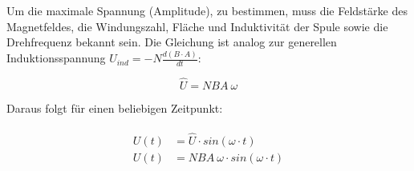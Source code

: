 Um die maximale Spannung (Amplitude), zu bestimmen, muss die Feldstärke des Magnetfeldes, die Windungszahl, Fläche und Induktivität der Spule sowie die Drehfrequenz bekannt sein. Die Gleichung ist analog zur generellen Induktionsspannung $U_{ind} = -N \frac{d(B \cdot A)}{dt}$:

\begin{equation}	\label{eq:hatU}
	\hat{U} = NBA \ \omega
\end{equation}

Daraus folgt für einen beliebigen Zeitpunkt:

\begin{align}		\label{eq:hatUbeliebig}
\begin{split}
	U(t) &= \hat{U} \cdot sin(\omega \cdot t) \\
	U(t) &= NBA \ \omega \cdot sin(\omega \cdot t)
\end{split}
\end{align}




